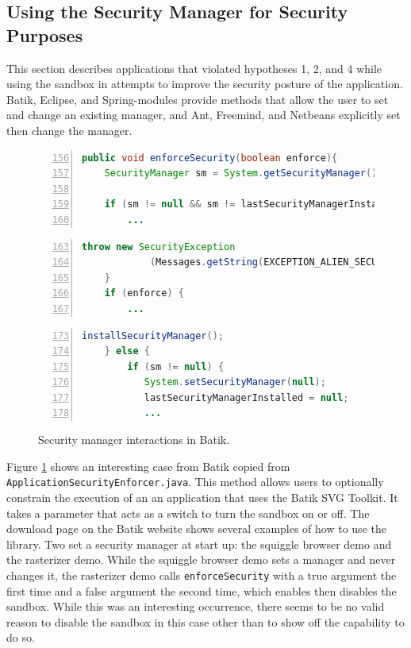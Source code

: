 \documentclass{sig-alternate}
\begin{document}
\subsection{Using the Security Manager for Security Purposes}\label{sub:Using-the-Security}

This section describes applications that violated hypotheses 1, 2,
and 4 while using the sandbox in attempts to improve the security
posture of the application. Batik, Eclipse, and Spring-modules provide
methods that allow the user to set and change an existing manager,
and Ant, Freemind, and Netbeans explicitly set then change the manager.

\begin{figure}
\begin{lstlisting}[language=Java,numbers=left,basicstyle={\scriptsize},breaklines=true,firstnumber=156,xrightmargin={0.1cm},numbersep={-10pt}]
    public void enforceSecurity(boolean enforce){ 
    SecurityManager sm = System.getSecurityManager();

    if (sm != null && sm != lastSecurityManagerInstalled){
        ...
\end{lstlisting}


\begin{lstlisting}[language=Java,numbers=left,basicstyle={\scriptsize},breaklines=true,firstnumber=163,xrightmargin={0.1cm},numbersep={-10pt}]
        throw new SecurityException
            (Messages.getString(EXCEPTION_ALIEN_SECURITY_MANAGER));   
    }                  
    if (enforce) { 
        ...
\end{lstlisting}


\begin{lstlisting}[language=Java,numbers=left,basicstyle={\scriptsize},breaklines=true,firstnumber=173,xrightmargin={0.1cm},numbersep={-10pt}]
        installSecurityManager();         
    } else {             
        if (sm != null) {                 
           System.setSecurityManager(null);
           lastSecurityManagerInstalled = null;             
           ...
\end{lstlisting}


\protect\caption{Security manager interactions in Batik.}\label{fig:Batik-snippet}
\end{figure}


Figure \ref{fig:Batik-snippet} shows an interesting case from Batik
copied from \texttt{ApplicationSecurityEnforcer.java}. This method
allows users to optionally constrain the execution of an an application
that uses the Batik SVG Toolkit. It takes a parameter that acts as
a switch to turn the sandbox on or off. The download page on the Batik
website shows several examples of how to use the library. Two set
a security manager at start up: the squiggle browser demo and the
rasterizer demo. While the squiggle browser demo sets a manager and
never changes it, the rasterizer demo calls \texttt{enforceSecurity}
with a true argument the first time and a false argument the second
time, which enables then disables the sandbox. While this was an interesting
occurrence, there seems to be no valid reason to disable the sandbox
in this case other than to show off the capability to do so.
\end{document}
